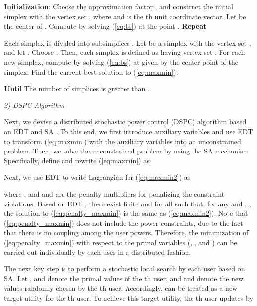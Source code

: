 \documentclass[10pt,journal,letterpaper,compsoc]{IEEEtran}
\begin{document}
{\begin{algorithm}
\caption{}
\label{alg:bsa}
\begin{algorithmic}
\STATE \textbf{Initialization}: Choose the approximation factor , and construct the initial simplex  with the vertex set , where  and  is the th unit coordinate vector. Let  be the center of . Compute   by solving (\ref{eq:bs}) at the point . \STATE \textbf{Repeat}
\begin{enumerate}
\STATE Each simplex is divided into  subsimplices . Let  be a simplex with the vertex set , and let . Choose . Then, each simplex  is defined as having vertex set .
\STATE For each new simplex, compute  by solving (\ref{eq:bs}) at  given by the center point of the simplex.
\STATE Find the current best solution to (\ref{eq:maxmin}).
\end{enumerate}
\STATE \textbf{Until} The number of simplices is greater than .
\end{algorithmic}
\end{algorithm}

\noindent
{\emph{2) DSPC Algorithm}

Next, we devise a distributed stochastic power control (DSPC) algorithm based on EDT \cite{chen:2008} and SA \cite{Kirkpatrick:1983}. To this end, we first introduce auxiliary variables and use EDT to transform (\ref{eq:maxmin}) with the auxiliary variables into an unconstrained problem. Then, we solve the unconstrained problem by using the SA mechanism. Specifically, define  and rewrite (\ref{eq:maxmin}) as


Next, we use EDT to write Lagrangian for (\ref{eq:maxmin2}) as

where , and  and  are the penalty multipliers for penalizing the constraint violations. Based on EDT \cite{chen:2008}, there exist finite  and  for all  such that, for any  and , , the solution to (\ref{eq:penalty_maxmin}) is the same as (\ref{eq:maxmin2}). Note that (\ref{eq:penalty_maxmin}) does not include the power constraints, due to the fact that there is no coupling among the user powers. Therefore, the minimization of (\ref{eq:penalty_maxmin}) with respect to the primal variables (, , and ) can be carried out individually by each user in a distributed fashion.

The next key step is to perform a stochastic local search by each user based on SA. Let ,  and  denote the primal values of the th user, and  and  denote the new values randomly chosen by the th user. Accordingly,  can be treated as a new target utility for the th user. To achieve this target utility, the th user updates  by

}}
\end{document}
